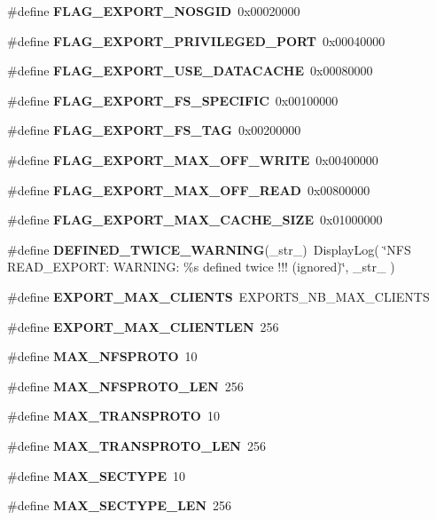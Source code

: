 \begin{CompactItemize}
\#define {\bf FLAG\_\-EXPORT\_\-NOSGID}\ 0x00020000
\item 
\#define {\bf FLAG\_\-EXPORT\_\-PRIVILEGED\_\-PORT}\ 0x00040000
\item 
\#define {\bf FLAG\_\-EXPORT\_\-USE\_\-DATACACHE}\ 0x00080000
\item 
\#define {\bf FLAG\_\-EXPORT\_\-FS\_\-SPECIFIC}\ 0x00100000
\item 
\#define {\bf FLAG\_\-EXPORT\_\-FS\_\-TAG}\ 0x00200000
\item 
\#define {\bf FLAG\_\-EXPORT\_\-MAX\_\-OFF\_\-WRITE}\ 0x00400000
\item 
\#define {\bf FLAG\_\-EXPORT\_\-MAX\_\-OFF\_\-READ}\ 0x00800000
\item 
\#define {\bf FLAG\_\-EXPORT\_\-MAX\_\-CACHE\_\-SIZE}\ 0x01000000
\item 
\#define {\bf DEFINED\_\-TWICE\_\-WARNING}(\_\-str\_\-)\ Display\-Log( \char`\"{}NFS READ\_\-EXPORT: WARNING: \%s defined twice !!! (ignored)\char`\"{}, \_\-str\_\- )
\item 
\#define {\bf EXPORT\_\-MAX\_\-CLIENTS}\ EXPORTS\_\-NB\_\-MAX\_\-CLIENTS
\item 
\#define {\bf EXPORT\_\-MAX\_\-CLIENTLEN}\ 256
\item 
\#define {\bf MAX\_\-NFSPROTO}\ 10
\item 
\#define {\bf MAX\_\-NFSPROTO\_\-LEN}\ 256
\item 
\#define {\bf MAX\_\-TRANSPROTO}\ 10
\item 
\#define {\bf MAX\_\-TRANSPROTO\_\-LEN}\ 256
\item 
\#define {\bf MAX\_\-SECTYPE}\ 10
\item 
\#define {\bf MAX\_\-SECTYPE\_\-LEN}\ 256
\end{CompactItemize}
